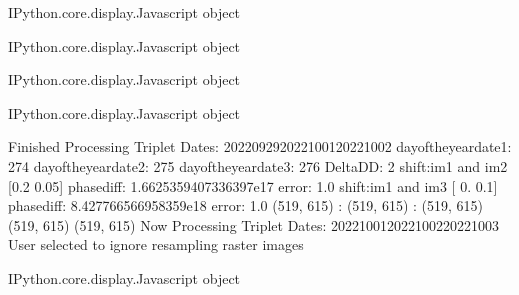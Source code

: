 \documentclass[letterpaper,10pt]{sphinxmanual}
\begin{document}
\begin{sphinxVerbatim}[commandchars=\\\{\}]
\PYGZlt{}IPython.core.display.Javascript object\PYGZgt{}
\end{sphinxVerbatim}



\begin{sphinxVerbatim}[commandchars=\\\{\}]
\PYGZlt{}IPython.core.display.Javascript object\PYGZgt{}
\end{sphinxVerbatim}



\begin{sphinxVerbatim}[commandchars=\\\{\}]
\PYGZlt{}IPython.core.display.Javascript object\PYGZgt{}
\end{sphinxVerbatim}



\begin{sphinxVerbatim}[commandchars=\\\{\}]
\PYGZlt{}IPython.core.display.Javascript object\PYGZgt{}
\end{sphinxVerbatim}



\begin{sphinxVerbatim}[commandchars=\\\{\}]
Finished Processing Triplet Dates:  20220929\PYGZhy{}20221001\PYGZhy{}20221002
day\PYGZus{}of\PYGZus{}the\PYGZus{}year\PYGZus{}date1:  274
\PYGZhy{}\PYGZhy{}\PYGZhy{}\PYGZhy{}\PYGZhy{}\PYGZhy{}\PYGZhy{}\PYGZhy{}\PYGZhy{}\PYGZhy{}\PYGZhy{}\PYGZhy{}\PYGZhy{}\PYGZhy{}\PYGZhy{}\PYGZhy{}\PYGZhy{}\PYGZhy{}\PYGZhy{}\PYGZhy{}\PYGZhy{}
day\PYGZus{}of\PYGZus{}the\PYGZus{}year\PYGZus{}date2:  275
\PYGZhy{}\PYGZhy{}\PYGZhy{}\PYGZhy{}\PYGZhy{}\PYGZhy{}\PYGZhy{}\PYGZhy{}\PYGZhy{}\PYGZhy{}\PYGZhy{}\PYGZhy{}\PYGZhy{}\PYGZhy{}\PYGZhy{}\PYGZhy{}\PYGZhy{}\PYGZhy{}\PYGZhy{}\PYGZhy{}\PYGZhy{}
day\PYGZus{}of\PYGZus{}the\PYGZus{}year\PYGZus{}date3:  276
\PYGZhy{}\PYGZhy{}\PYGZhy{}\PYGZhy{}\PYGZhy{}\PYGZhy{}\PYGZhy{}\PYGZhy{}\PYGZhy{}\PYGZhy{}\PYGZhy{}\PYGZhy{}\PYGZhy{}\PYGZhy{}\PYGZhy{}\PYGZhy{}\PYGZhy{}\PYGZhy{}\PYGZhy{}\PYGZhy{}\PYGZhy{}
Delta\PYGZus{}DD: 2
shift:im1 and im2 [\PYGZhy{}0.2  \PYGZhy{}0.05] phasediff: \PYGZhy{}1.6625359407336397e\PYGZhy{}17 error: 1.0
shift:im1 and im3 [ 0.  \PYGZhy{}0.1] phasediff: \PYGZhy{}8.427766566958359e\PYGZhy{}18 error: 1.0
(519, 615) :  (519, 615) :  (519, 615)
(519, 615)
(519, 615)
Now Processing Triplet Dates:  20221001\PYGZhy{}20221002\PYGZhy{}20221003
 User selected to ignore resampling raster images 



\PYGZlt{}IPython.core.display.Javascript object\PYGZgt{}
\end{sphinxVerbatim}
\end{document}

